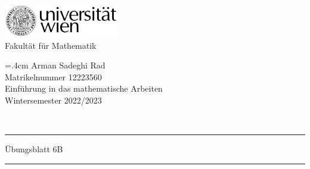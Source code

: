 \documentclass{article}
\theoremstyle{definition}
\begin{document}
	
	\thispagestyle{plain}
	\begin{minipage}{5cm}
		\includegraphics[width=5cm]{logo}\\
		\centering
		Fakultät für Mathematik
	\end{minipage}
	\hfill
	\begin{minipage}{7cm}
		\baselineskip=.4cm
		Arman Sadeghi Rad\\
		Matrikelnummer 12223560 \\
		Einführung in das mathematische Arbeiten \\
		Wintersemester 2022/2023
	\end{minipage}\\[1mm]
	\hrule height2pt \vskip1mm
	\noindent
	Übungsblatt 6B
	\hrule height2pt \vskip1mm
\end{document}
